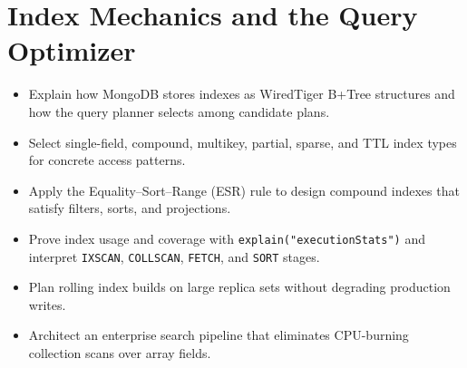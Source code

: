 \chapter{Index Mechanics and the Query Optimizer}
%

\begin{objectives}
\begin{itemize}
    \item Explain how MongoDB stores indexes as WiredTiger B+Tree structures and how the query planner selects among candidate plans.
    \item Select single-field, compound, multikey, partial, sparse, and TTL index types for concrete access patterns.
    \item Apply the Equality--Sort--Range (ESR) rule to design compound indexes that satisfy filters, sorts, and projections.
    \item Prove index usage and coverage with \texttt{explain("executionStats")} and interpret \texttt{IXSCAN}, \texttt{COLLSCAN}, \texttt{FETCH}, and \texttt{SORT} stages.
    \item Plan rolling index builds on large replica sets without degrading production writes.
    \item Architect an enterprise search pipeline that eliminates CPU-burning collection scans over array fields.
\end{itemize}
\end{objectives}

